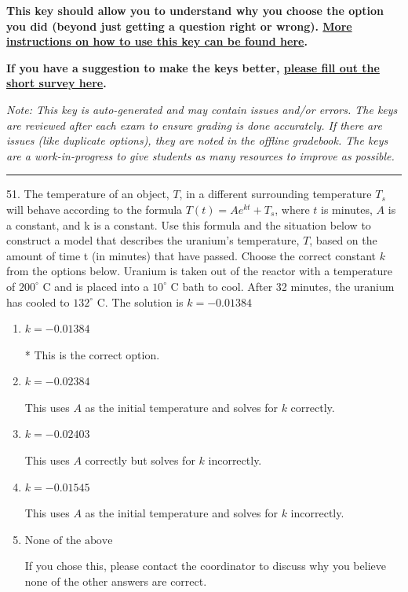 \documentclass{extbook}[14pt]
\begin{document}
\textbf{This key should allow you to understand why you choose the option you did (beyond just getting a question right or wrong). \href{https://xronos.clas.ufl.edu/mac1105spring2020/courseDescriptionAndMisc/Exams/LearningFromResults}{More instructions on how to use this key can be found here}.}

\textbf{If you have a suggestion to make the keys better, \href{https://forms.gle/CZkbZmPbC9XALEE88}{please fill out the short survey here}.}

\textit{Note: This key is auto-generated and may contain issues and/or errors. The keys are reviewed after each exam to ensure grading is done accurately. If there are issues (like duplicate options), they are noted in the offline gradebook. The keys are a work-in-progress to give students as many resources to improve as possible.}

\rule{\textwidth}{0.4pt}

51. The temperature of an object, $T$, in a different surrounding temperature $T_s$ will behave according to the formula $T(t) = Ae^{kt} + T_s$, where $t$ is minutes, $A$ is a constant, and k is a constant. Use this formula and the situation below to construct a model that describes the uranium's temperature, $T$, based on the amount of time t (in minutes) that have passed. Choose the correct constant $k$ from the options below.
Uranium is taken out of the reactor with a temperature of $200^{\circ}$ C and is placed into a $10^{\circ}$ C bath to cool. After 32 minutes, the uranium has cooled to $132^{\circ}$ C. 
The solution is $ k = -0.01384 $ 

\begin{enumerate}[label=\Alph*.] 
\item $ k = -0.01384 $ 

 * This is the correct option. 
\item $ k = -0.02384 $ 

 This uses $A$ as the initial temperature and solves for $k$ correctly. 
\item $ k = -0.02403 $ 

 This uses $A$ correctly but solves for $k$ incorrectly. 
\item $ k = -0.01545 $ 

 This uses $A$ as the initial temperature and solves for $k$ incorrectly. 
\item $ \text{None of the above} $ 

 If you chose this, please contact the coordinator to discuss why you believe none of the other answers are correct. 
\end{enumerate} 
 
\end{document}
